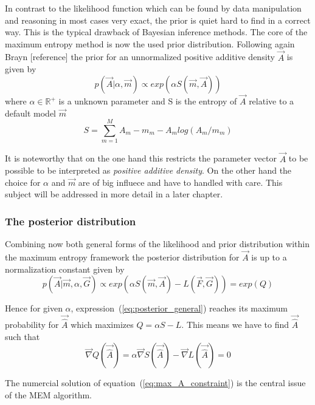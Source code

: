 In contrast to the likelihood function which can be found by data manipulation and reasoning in most cases very exact, the 
prior is quiet hard to find in a correct way. This is the typical drawback of Bayesian inference methods.
The core of the maximum entropy method is now the used prior distribution. Following again Brayn [reference] the prior for 
an unnormalized positive additive density $\vec{A}$ is given by
\begin{displaymath}
 p(\vec{A}| \alpha, \vec{m}) \propto exp(\alpha S(\vec{m},\vec{A}))
\end{displaymath}
where $\alpha \in \mathbb{R}^+$ is a unknown parameter and S is the entropy of $\vec{A}$ relative to a default model $\vec{m}$
\begin{equation}
 S = \sum_{m=1}^{M} A_m -m_m -A_m log(A_m/m_m)
 \label{eq:S(A,m)}
\end{equation}

\noindent It is noteworthy that on the one hand this restricts the parameter vector $\vec{A}$ to be possible to be interpreted as 
\textit{positive additive density}. On the other hand the choice for $\alpha$ and $\vec{m}$ are of big influece and have to 
handled with care. This subject will be addressed in more detail in a later chapter. 

\subsubsection{The posterior distribution}

\noindent Combining now both general forms of the likelihood and prior distribution within the maximum entropy framework the posterior 
distribution for $\vec{A}$ is up to a normalization constant given by 
\begin{equation}\label{eq:posterior_general}
 p(\vec{A}|\vec{m},\alpha,\vec{G}) \propto exp(\alpha S(\vec{m},\vec{A}) - L(\vec{F},\vec{G})) = exp(Q)
\end{equation}


\noindent Hence for given $\alpha$, expression~(\ref{eq:posterior_general}) reaches its maximum probability for $\vec{\hat{A}}$
which maximizes $Q = \alpha S - L$. This means we have to find $\vec{\hat{A}}$ such that
\begin{equation}\label{eq:max_A_constraint}
 \vec{\nabla} Q(\vec{\hat{A}}) = \alpha \vec{\nabla} S(\vec{\hat{A}}) - \vec{\nabla} L(\vec{\hat{A}}) = 0
\end{equation}

\noindent The numercial solution of equation~(\ref{eq:max_A_constraint}) is the central issue of the MEM algorithm. 

